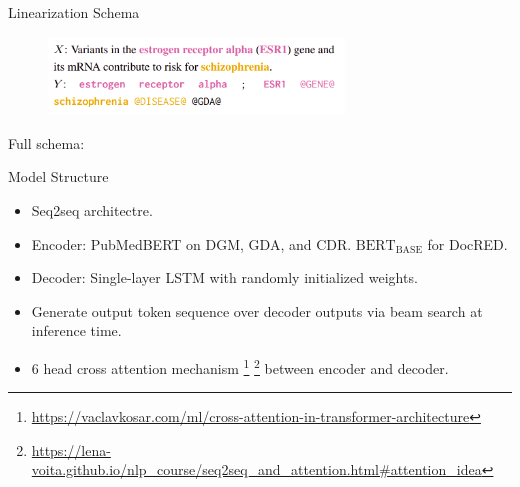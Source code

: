 \documentclass[usenames,dvipsnames,pdf]{beamer}
\begin{document}
        
        \begin{frame}{Linearization Schema}
          \begin{figure}
          \includegraphics[width=0.7\textwidth,height=0.7\textheight,keepaspectratio]{linearization} 
          \end{figure}
          Full schema:

          
          \begin{adjustbox}{varwidth=\linewidth}%
            \small{}


            \small{}


            \small{}
            \end{adjustbox}
        \end{frame}

        
        \begin{frame}{Model Structure}
          \begin{itemize}
          \item
            Seq2seq architectre.
          \item
            Encoder: PubMedBERT on DGM, GDA, and CDR.  $\text{BERT}_{\text{BASE}}$ for DocRED.
          \item
            Decoder: Single-layer LSTM with randomly initialized weights.
          \item
            Generate output token sequence over decoder outputs via beam search at inference time.  
          \item
            6 head cross attention mechanism
            \footnote{\url{https://vaclavkosar.com/ml/cross-attention-in-transformer-architecture}}
            \footnote{\url{https://lena-voita.github.io/nlp_course/seq2seq_and_attention.html\#attention_idea}}
            between encoder and decoder.
          \end{itemize}
        \end{frame}
\end{document}
